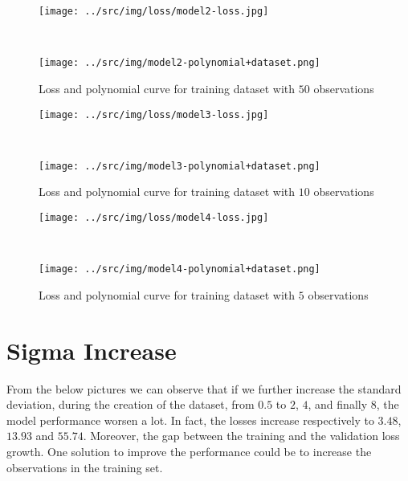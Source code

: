 \documentclass[a4paper,12pt]{article} %
\begin{document}
	\begin{figure}[H]
		\begin{minipage}[c]{.49\textwidth}
			\centering
			\texttt{[image: ../src/img/loss/model2-loss.jpg]}
		\end{minipage}
		~
		\begin{minipage}[c]{.49\textwidth}
			\centering
			\texttt{[image: ../src/img/model2-polynomial+dataset.png]}
		\end{minipage}
	\caption{Loss and polynomial curve for training dataset with $50$ 
	observations}
	\end{figure}
	
	\begin{figure}[H]
		\begin{minipage}[c]{.49\textwidth}
			\centering
			\texttt{[image: ../src/img/loss/model3-loss.jpg]}
		\end{minipage}
		~
		\begin{minipage}[c]{.49\textwidth}
			\centering
			\texttt{[image: ../src/img/model3-polynomial+dataset.png]}
		\end{minipage}
	\caption{Loss and polynomial curve for training dataset with $10$ 
		observations}
	\end{figure}
	
	\begin{figure}[H]
		\begin{minipage}[c]{.49\textwidth}
			\centering
			\texttt{[image: ../src/img/loss/model4-loss.jpg]}
		\end{minipage}
		~
		\begin{minipage}[c]{.49\textwidth}
			\centering
			\texttt{[image: ../src/img/model4-polynomial+dataset.png]}
		\end{minipage}
	\caption{Loss and polynomial curve for training dataset with $5$ 
	observations}
	\end{figure}
	
	\section{Sigma Increase}
	From the below pictures we can observe that if we further increase the  
	standard deviation, during the creation of the dataset, from $0.5$ to $2$, 
	$4$, and finally $8$, the model performance worsen a lot. In fact, the 
	losses increase respectively to $3.48$, $13.93$ and $55.74$. Moreover, the 
	gap between the training and the validation loss growth.
	One solution to improve the performance could be to increase the 
	observations in the training set.
	
\end{document}
